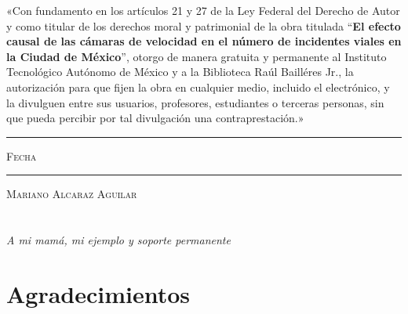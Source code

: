 \documentclass[11pt, oneside]{book}
\begin{document}
\thispagestyle{empty}

\vspace*{\fill}
\begingroup

\noindent
«Con fundamento en los artículos 21 y 27 de la Ley Federal del Derecho de Autor y como titular de los derechos moral y patrimonial de la obra titulada ``\textbf{El efecto causal de las cámaras de velocidad en el número de incidentes viales en la Ciudad de México}'', otorgo de manera gratuita y permanente al Instituto Tecnológico Autónomo de México y a la Biblioteca Raúl Bailléres Jr., la autorización para que fijen la obra en cualquier medio, incluido el electrónico, y la divulguen entre sus usuarios, profesores, estudiantes o terceras personas, sin que pueda percibir por tal divulgación una contraprestación.»


\centering 

\vspace{5em}

\rule[1em]{20em}{0.5pt} %

\textsc{Fecha}
 
\vspace{8em}

\rule[1em]{20em}{0.5pt} %

\textsc{Mariano Alcaraz Aguilar}

\endgroup
\vspace*{\fill}


\pagestyle{plain}
\frontmatter

\chapter*{}
\begin{flushright}
\textit{A mi mamá, mi ejemplo y soporte permanente}
\end{flushright}


\chapter*{Agradecimientos}
\end{document}

